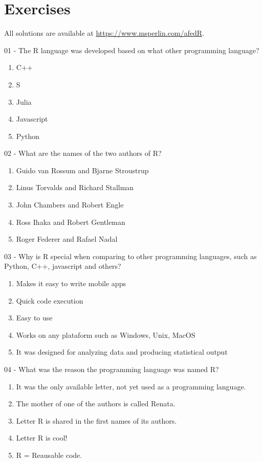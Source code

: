\documentclass[
  12pt,
]{book}
\providecommand{\tightlist}{%
  \setlength{\itemsep}{0pt}\setlength{\parskip}{0pt}}
\begin{document}
\hypertarget{exercises}{%
\section{Exercises}\label{exercises}}

All solutions are available at \url{https://www.msperlin.com/afedR}.

01 -
The R language was developed based on what other programming language?

\begin{enumerate}
\def\labelenumi{\alph{enumi})}
\tightlist
\item
  C++
\item
  S
\item
  Julia
\item
  Javascript
\item
  Python
\end{enumerate}

02 -
What are the names of the two authors of R?

\begin{enumerate}
\def\labelenumi{\alph{enumi})}
\tightlist
\item
  Guido van Rossum and Bjarne Stroustrup
\item
  Linus Torvalds and Richard Stallman
\item
  John Chambers and Robert Engle
\item
  Ross Ihaka and Robert Gentleman
\item
  Roger Federer and Rafael Nadal
\end{enumerate}

03 -
Why is R special when comparing to other programming languages, such as Python, C++, javascript and others?

\begin{enumerate}
\def\labelenumi{\alph{enumi})}
\tightlist
\item
  Makes it easy to write mobile apps
\item
  Quick code execution
\item
  Easy to use
\item
  Works on any plataform such as Windows, Unix, MacOS
\item
  It was designed for analyzing data and producing statistical output
\end{enumerate}

04 -
What was the reason the programming language was named R?

\begin{enumerate}
\def\labelenumi{\alph{enumi})}
\tightlist
\item
  It was the only available letter, not yet used as a programming language.
\item
  The mother of one of the authors is called Renata.
\item
  Letter R is shared in the first names of its authors.
\item
  Letter R is cool!
\item
  R = Reausable code.
\end{enumerate}
\end{document}
